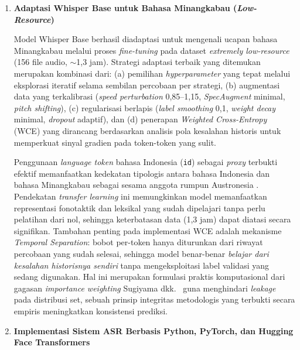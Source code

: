 \begin{enumerate}

    \item \textbf{Adaptasi Whisper Base untuk Bahasa Minangkabau (\textit{Low-Resource})}

    Model Whisper Base berhasil diadaptasi untuk mengenali ucapan bahasa Minangkabau melalui proses \textit{fine-tuning} pada dataset \textit{extremely low-resource} (156 file audio, $\sim$1,3 jam). Strategi adaptasi terbaik yang ditemukan merupakan kombinasi dari: (a) pemilihan \textit{hyperparameter} yang tepat melalui eksplorasi iteratif selama sembilan percobaan per strategi, (b) augmentasi data yang terkalibrasi (\textit{speed perturbation} 0,85--1,15, \textit{SpecAugment} minimal, \textit{pitch shifting}), (c) regularisasi berlapis (\textit{label smoothing} 0,1, \textit{weight decay} minimal, \textit{dropout} adaptif), dan (d) penerapan \textit{Weighted Cross-Entropy} (WCE) yang dirancang berdasarkan analisis pola kesalahan historis untuk memperkuat sinyal gradien pada token-token yang sulit.

    Penggunaan \textit{language token} bahasa Indonesia (\texttt{id}) sebagai \textit{proxy} terbukti efektif memanfaatkan kedekatan tipologis antara bahasa Indonesia dan bahasa Minangkabau sebagai sesama anggota rumpun Austronesia \cite{koto2020minangkabau}. Pendekatan \textit{transfer learning} ini memungkinkan model memanfaatkan representasi fonotaktik dan leksikal yang sudah dipelajari tanpa perlu pelatihan dari nol, sehingga keterbatasan data (1,3 jam) dapat diatasi secara signifikan. Tambahan penting pada implementasi WCE adalah mekanisme \textit{Temporal Separation}: bobot per-token hanya diturunkan dari riwayat percobaan yang sudah selesai, sehingga model benar-benar \textit{belajar dari kesalahan historisnya sendiri} tanpa mengeksploitasi label validasi yang sedang digunakan. Hal ini merupakan formulasi praktis komputasional dari gagasan \textit{importance weighting} Sugiyama dkk.\ \cite{sugiyama2007covariate} guna menghindari \textit{leakage} pada distribusi set, sebuah prinsip integritas metodologis yang terbukti secara empiris meningkatkan konsistensi prediksi.

    \item \textbf{Implementasi Sistem ASR Berbasis Python, PyTorch, dan Hugging Face Transformers}


\end{enumerate}
